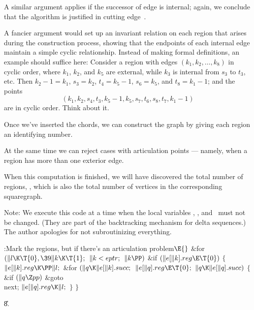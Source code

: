A similar argument applies if the successor of edge  is internal;
again, we conclude that the  algorithm is justified
in cutting edge~.

A fancier argument would set up an invariant relation on each region
that arises during the construction process, showing that the
endpoints of each internal edge maintain a simple cyclic relationship.
Instead of making formal definitions, an example should suffice here:
Consider a region with edges $(k_1,k_2,\ldots,k_8)$ in cyclic order,
where $k_1$, $k_2$, and $k_5$ are external, while $k_3$ is
internal from $s_3$ to $t_3$, etc. Then $k_2-1=k_1$, $s_3=k_2$, $t_4=k_5-1$,
$s_6=k_5$, and $t_8=k_1-1$; and the points
$$(k_1,k_2,s_4,t_3,k_5-1,k_5,s_7,t_6,s_8,t_7,k_1-1)$$
are in cyclic order. Think about it.

\fi

Once we've inserted the chords, we can construct the
graph by
giving each region an identifying number.

At the same time we can reject cases with articulation points ---
namely, when a region has more than one exterior edge.

When this computation is finished, we will have discovered the total number of
regions, , which is also the total number of vertices in the
corresponding
squaregraph.

Note: We execute this code at a time when the local variables , ,
and~ must not be changed. (They are part of the backtracking mechanism
for delta sequences.) The author apologies for not subroutinizing everything.

\Y\B\4:Mark the regions, but  if there's an
articulation problem\X${}\E{}$\6
\&{for} ${}(\|l\K\T{0},\39\|k\K\T{1};{}$ ${}\|k<\\{eptr};{}$ ${}\|k\PP){}$\1\6
\&{if} ${}(\|e[\|k].\\{reg}\E\T{0}){}$\5
${}\{{}$\1\6
${}\|e[\|k].\\{reg}\K\PP\|l;{}$\6
\&{for} ${}(\|q\K\|e[\|k].\\{succ};{}$ ${}\|e[\|q].\\{reg}\E\T{0};{}$ ${}\|q\K%
\|e[\|q].\\{succ}){}$\5
${}\{{}$\1\6
\&{if} ${}(\|q\Z\\{pp}){}$\1\5
\&{goto} \\{next};\2\6
${}\|e[\|q].\\{reg}\K\|l;{}$\6
\4${}\}{}$\2\6
\4${}\}{}$\2\2\par
\U8.\fi

